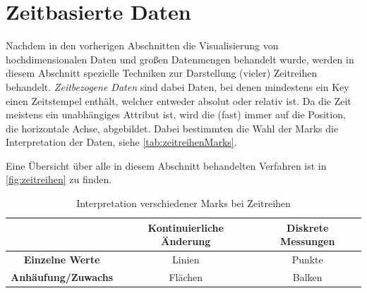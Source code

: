 \section{Zeitbasierte Daten}
\label{sec:visZeitbasiert}

Nachdem in den vorherigen Abschnitten die Visualisierung von hochdimensionalen Daten und großen Datenmengen behandelt wurde, werden in diesem Abschnitt spezielle Techniken zur Darstellung (vieler) Zeitreihen behandelt. \emph{Zeitbezogene Daten} sind dabei Daten, bei denen mindestens ein Key einen Zeitstempel enthält, welcher entweder absolut oder relativ ist. Da die Zeit meistens ein unabhängiges Attribut ist, wird die (fast) immer auf die Position, \zB die horizontale Achse, abgebildet. Dabei bestimmten die Wahl der Marks die Interpretation der Daten, siehe \autoref{tab:zeitreihenMarks}.

Eine Übersicht über alle in diesem Abschnitt behandelten Verfahren ist in \autoref{fig:zeitreihen} zu finden.

\begin{table}
	\centering
	\begin{tabular}{c|cc}
		\toprule
		                           & \textbf{Kontinuierliche Änderung} & \textbf{Diskrete Messungen} \\ \midrule
		\textbf{Einzelne Werte}    & Linien                            & Punkte                      \\
		\textbf{Anhäufung/Zuwachs} & Flächen                           & Balken                      \\ \bottomrule
	\end{tabular}
	\caption{Interpretation verschiedener Marks bei Zeitreihen}
	\label{tab:zeitreihenMarks}
\end{table}

